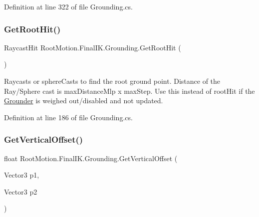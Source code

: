 Definition at line 322 of file Grounding.\+cs.

\mbox{\label{class_root_motion_1_1_final_i_k_1_1_grounding_a02348168fa9773f73b8697f82dae16e8}} 
\subsubsection{\texorpdfstring{Get\+Root\+Hit()}{GetRootHit()}}
{\footnotesize\ttfamily Raycast\+Hit Root\+Motion.\+Final\+I\+K.\+Grounding.\+Get\+Root\+Hit (\begin{DoxyParamCaption}{ }\end{DoxyParamCaption})}



Raycasts or sphere\+Casts to find the root ground point. Distance of the Ray/\+Sphere cast is max\+Distance\+Mlp x max\+Step. Use this instead of root\+Hit if the \mbox{\hyperlink{class_root_motion_1_1_final_i_k_1_1_grounder}{Grounder}} is weighed out/disabled and not updated. 



Definition at line 186 of file Grounding.\+cs.

\mbox{\label{class_root_motion_1_1_final_i_k_1_1_grounding_ad5a6e20c912d62c4c289c91f89618a79}} 
\subsubsection{\texorpdfstring{Get\+Vertical\+Offset()}{GetVerticalOffset()}}
{\footnotesize\ttfamily float Root\+Motion.\+Final\+I\+K.\+Grounding.\+Get\+Vertical\+Offset (\begin{DoxyParamCaption}\item[{Vector3}]{p1,  }\item[{Vector3}]{p2 }\end{DoxyParamCaption})}




